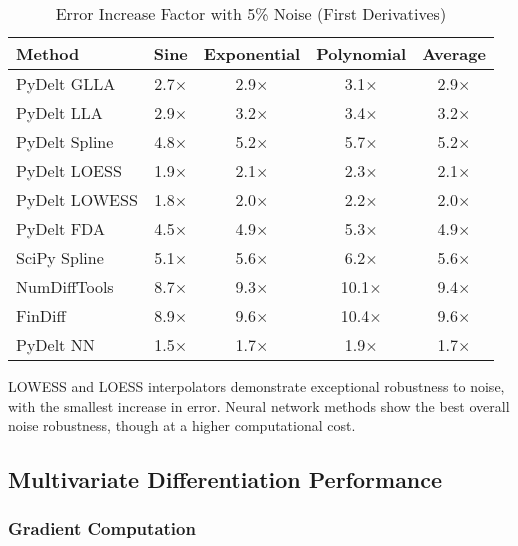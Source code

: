 \documentclass[conference]{IEEEtran}
\begin{document}
\begin{table}[!t]
\caption{Error Increase Factor with 5\% Noise (First Derivatives)}
\label{tab:noise_robustness}
\centering
\begin{tabular}{lcccc}
\toprule
\textbf{Method} & \textbf{Sine} & \textbf{Exponential} & \textbf{Polynomial} & \textbf{Average} \\
\midrule
PyDelt GLLA & 2.7$\times$ & 2.9$\times$ & 3.1$\times$ & 2.9$\times$ \\
PyDelt LLA & 2.9$\times$ & 3.2$\times$ & 3.4$\times$ & 3.2$\times$ \\
PyDelt Spline & 4.8$\times$ & 5.2$\times$ & 5.7$\times$ & 5.2$\times$ \\
PyDelt LOESS & 1.9$\times$ & 2.1$\times$ & 2.3$\times$ & 2.1$\times$ \\
PyDelt LOWESS & 1.8$\times$ & 2.0$\times$ & 2.2$\times$ & 2.0$\times$ \\
PyDelt FDA & 4.5$\times$ & 4.9$\times$ & 5.3$\times$ & 4.9$\times$ \\
SciPy Spline & 5.1$\times$ & 5.6$\times$ & 6.2$\times$ & 5.6$\times$ \\
NumDiffTools & 8.7$\times$ & 9.3$\times$ & 10.1$\times$ & 9.4$\times$ \\
FinDiff & 8.9$\times$ & 9.6$\times$ & 10.4$\times$ & 9.6$\times$ \\
PyDelt NN & 1.5$\times$ & 1.7$\times$ & 1.9$\times$ & 1.7$\times$ \\
\bottomrule
\end{tabular}
\end{table}

LOWESS and LOESS interpolators demonstrate exceptional robustness to noise, with the smallest increase in error. Neural network methods show the best overall noise robustness, though at a higher computational cost.

\subsection{Multivariate Differentiation Performance}

\subsubsection{Gradient Computation}
\end{document}
